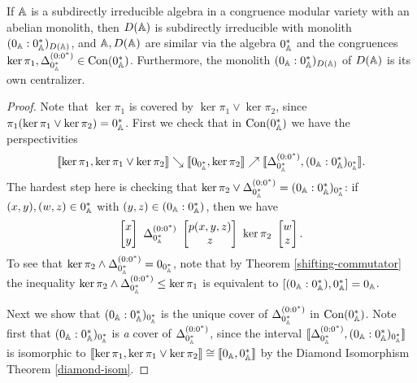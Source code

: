 \begin{appendices}
\begin{prop} If $\mathbb{A}$ is a subdirectly irreducible algebra in a congruence modular variety with an abelian monolith, then $D(\mathbb{A})$ is subdirectly irreducible with monolith $(0_{\mathbb{A}}:0_{\mathbb{A}}^*)_{D(\mathbb{A})}$, and $\mathbb{A}, D(\mathbb{A})$ are similar via the algebra $0_{\mathbb{A}}^*$ and the congruences $\ker \pi_1, \Delta_{0_{\mathbb{A}}^*}^{(0:0^*)} \in \operatorname{Con}(0_{\mathbb{A}}^*)$. Furthermore, the monolith $(0_{\mathbb{A}}:0_{\mathbb{A}}^*)_{D(\mathbb{A})}$ of $D(\mathbb{A})$ is its own centralizer.
\end{prop}
\begin{proof} Note that $\ker \pi_1$ is covered by $\ker \pi_1 \vee \ker \pi_2$, since $\pi_1(\ker \pi_1 \vee \ker \pi_2) = 0_{\mathbb{A}}^*$. First we check that in $\operatorname{Con}(0_{\mathbb{A}}^*)$ we have the perspectivities
\[
\llbracket \ker \pi_1, \ker \pi_1 \vee \ker \pi_2\rrbracket \searrow \llbracket 0_{0_{\mathbb{A}}^*}, \ker \pi_2 \rrbracket \nearrow \llbracket \Delta_{0_{\mathbb{A}}^*}^{(0:0^*)}, (0_{\mathbb{A}} : 0_{\mathbb{A}}^*)_{0_{\mathbb{A}}^*}\rrbracket.
\]
The hardest step here is checking that $\ker \pi_2 \vee \Delta_{0_{\mathbb{A}}^*}^{(0:0^*)} = (0_{\mathbb{A}} : 0_{\mathbb{A}}^*)_{0_{\mathbb{A}}^*}$: if $(x,y), (w,z) \in 0_{\mathbb{A}}^*$ with $(y,z) \in (0_{\mathbb{A}} : 0_{\mathbb{A}}^*)$, then we have
\[
\begin{bmatrix} x \\ y \end{bmatrix}\ \Delta_{0_\bA^*}^{(0:0^*)}\ \begin{bmatrix} p(x,y,z)\\ z\end{bmatrix}\ \ker \pi_2\ \begin{bmatrix} w\\ z\end{bmatrix}.
\]
To see that $\ker \pi_2 \wedge \Delta_{0_{\mathbb{A}}^*}^{(0:0^*)} = 0_{0_{\mathbb{A}}^*}$, note that by Theorem \ref{shifting-commutator} the inequality $\ker \pi_2 \wedge \Delta_{0_{\mathbb{A}}^*}^{(0:0^*)} \le \ker \pi_1$ is equivalent to $[(0_{\mathbb{A}}:0_{\mathbb{A}}^*),0_{\mathbb{A}}^*] = 0_{\mathbb{A}}$.

Next we show that $(0_{\mathbb{A}} : 0_{\mathbb{A}}^*)_{0_{\mathbb{A}}^*}$ is the unique cover of $\Delta_{0_{\mathbb{A}}^*}^{(0:0^*)}$ in $\operatorname{Con}(0_{\mathbb{A}}^*)$. Note first that $(0_{\mathbb{A}} : 0_{\mathbb{A}}^*)_{0_{\mathbb{A}}^*}$ is \emph{a} cover of $\Delta_{0_{\mathbb{A}}^*}^{(0:0^*)}$, since the interval $\llbracket \Delta_{0_{\mathbb{A}}^*}^{(0:0^*)}, (0_{\mathbb{A}} : 0_{\mathbb{A}}^*)_{0_{\mathbb{A}}^*}\rrbracket$ is isomorphic to $\llbracket \ker \pi_1, \ker \pi_1 \vee \ker \pi_2\rrbracket \cong \llbracket 0_{\mathbb{A}}, 0_{\mathbb{A}}^* \rrbracket$ by the Diamond Isomorphism Theorem \ref{diamond-isom}.


\end{proof}
\end{appendices}
